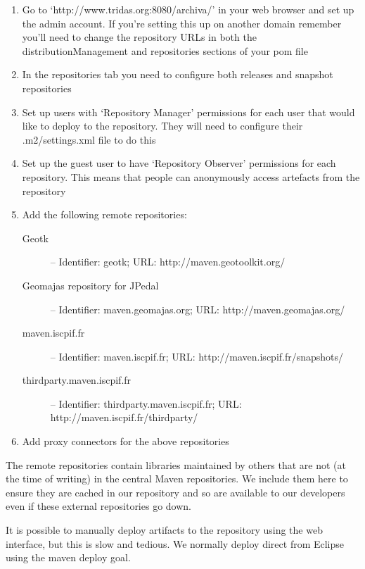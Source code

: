 \begin{enumerate}
 \item Go to `http://www.tridas.org:8080/archiva/' in your web browser and set up the admin account.  If you're setting this up on another domain remember you'll need to change the repository URLs in both the distributionManagement and repositories sections of your pom file
 \item In the repositories tab you need to configure both releases and snapshot repositories
 \item Set up users with `Repository Manager' permissions for each user that would like to deploy to the repository.  They will need to configure their .m2/settings.xml file to do this
 \item Set up the guest user to have `Repository Observer' permissions for each repository.  This means that people can anonymously access artefacts from the repository
 \item Add the following remote repositories:
      \begin{description}
       \item[Geotk] -- Identifier: geotk; URL: http://maven.geotoolkit.org/
       \item[Geomajas repository for JPedal] -- Identifier: maven.geomajas.org; URL: http://maven.geomajas.org/
       \item[maven.iscpif.fr] -- Identifier: maven.iscpif.fr; URL: http://maven.iscpif.fr/snapshots/
       \item[thirdparty.maven.iscpif.fr] -- Identifier: thirdparty.maven.iscpif.fr; URL: http://maven.iscpif.fr/thirdparty/
      \end{description}
 \item Add proxy connectors for the above repositories

\end{enumerate}

The remote repositories contain libraries maintained by others that are not (at the time of writing) in the central Maven repositories.  We include them here to ensure they are cached in our repository and so are available to our developers even if these external repositories go down.

It is possible to manually deploy artifacts to the repository using the web interface, but this is slow and tedious.  We normally deploy direct from Eclipse using the maven deploy goal.  







